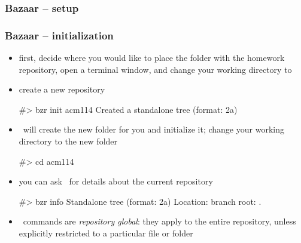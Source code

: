 \begin{frame}[fragile]
\begin{minipage}{.45\linewidth}
\begin{figure}
    \end{figure}
  \end{minipage}
%
\end{frame}

\begin{frame}[fragile]
%
  \frametitle{Bazaar -- setup}
%
%
\end{frame}

\begin{frame}[fragile]
%
  \frametitle{Bazaar -- initialization}
%
  \begin{itemize}
%
  \item first, decide where you would like to place the folder with the homework repository,
    open a terminal window, and change your working directory to
%
  \item create a new repository
%
    \begin{shell}{}
#> bzr init acm114
Created a standalone tree (format: 2a)
    \end{shell}
%
  \item \bzr\ will create the new folder for you and initialize it; change your working
    directory to the new folder
    \begin{shell}{}
#> cd acm114
    \end{shell}
%
  \item you can ask \bzr\ for details about the current repository
    \begin{shell}{}
#> bzr info
Standalone tree (format: 2a)
Location:
  branch root: .
    \end{shell}
%
  \item \bzr\ commands are {\em repository global}: they apply to the entire repository, unless
    explicitly restricted to a particular file or folder
%
  \end{itemize}
%
\end{frame}

